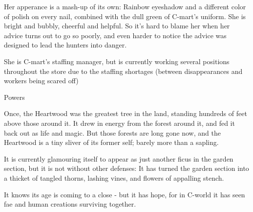 \documentclass{motw}
\begin{document}
Her apperance is a mash-up of its own:  Rainbow eyeshadow and a different color of polish on every nail, combined with the dull green of C-mart's uniform.  She is bright and bubbly, cheerful and helpful.  So it's hard to blame her when her advice turns out to go so poorly, and even harder to notice the advice was designed to lead the hunters into danger.

She is C-mart's staffing manager, but is currently working several positions throughout the store due to the staffing shortages (between disappearances and workers being scared off)

\begin{mStatList}{Powers}
\end{mStatList}


Once, the Heartwood was the greatest tree in the land, standing hundreds of feet above those around it.  It drew in energy from the forest around it, and fed it back out as life and magic.  But those forests are long gone now, and the Heartwood is a tiny sliver of its former self; barely more than a sapling.

It is currently glamouring itself to appear as just another ficus in the garden section, but it is not without other defenses:  It has turned the garden section into a thicket of tangled thorns, lashing vines, and flowers of appalling stench.

It knows its age is coming to a close - but it has hope, for in C-world it has seen fae and human creations surviving together.






\makeImageCredits[cc-by-nc-sa]
\end{document}
